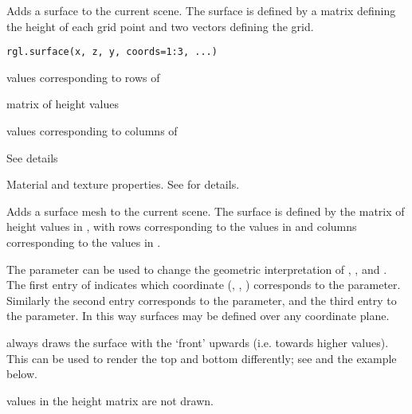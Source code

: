 \begin{Description}\relax
Adds a surface to the current scene. The surface is defined by 
a matrix defining the height of each grid point and two vectors
defining the grid.
\end{Description}
\begin{Usage}
\begin{verbatim}
rgl.surface(x, z, y, coords=1:3, ...)
\end{verbatim}
\end{Usage}
\begin{Arguments}
\begin{ldescription}
\item[\code{ x }] values corresponding to rows of 

\item[\code{ y }] matrix of height values

\item[\code{ z }] values corresponding to columns of 

\item[\code{ coords }] See details

\item[\code{ ... }] Material and texture properties. See  for details.
\end{ldescription}
\end{Arguments}
\begin{Details}\relax
Adds a surface mesh to the current scene. The surface is defined by 
the matrix of height values in , with rows corresponding 
to the values in  and columns corresponding to the values in 
.

The  parameter can be used to change the geometric
interpretation of , , and .  The first entry 
of  indicates which coordinate (, 
, ) corresponds to the  parameter.
Similarly the second entry corresponds to the  parameter,
and the third entry to the  parameter.  In this way 
surfaces may be defined over any coordinate plane.

 always draws the surface with the `front' upwards
(i.e. towards higher  values).  This can be used to render
the top and bottom differently; see  and
the example below.

 values in the height matrix are not drawn.
\end{Details}
